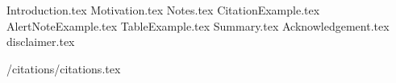 \documentclass[aspectratio=\BeamerAspectRatio]{beamer}
\begin{document}
\maketitlepage %
\maketableofcontents %
\makesectionpopup %

{Introduction.tex}
{Motivation.tex}
{Notes.tex}
{CitationExample.tex}
{AlertNoteExample.tex}
{TableExample.tex}
{Summary.tex}
{Acknowledgement.tex}
{disclaimer.tex}

{/citations/citations.tex}
\end{document}
